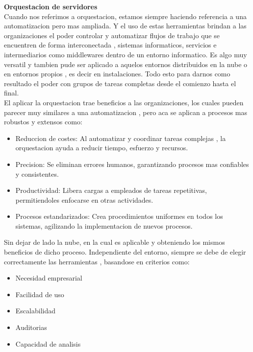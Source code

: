 \documentclass[12pt]{article}
\begin{document}
\vspace{1em}
\noindent\textbf{Orquestacion de servidores} \\
Cuando nos referimos a orquestacion, estamos siempre haciendo referencia a una automatizacion pero mas ampliada. Y el uso de estas herramientas brindan a las organizaciones el poder controlar y automatizar flujos de trabajo que se encuentren de forma interconectada , sistemas informaticos, servicios e intermediarios como middlewares dentro de un entorno informatico. Es algo muy versatil y tambien pude ser aplicado a aquelos entornos distribuidos en la nube o en entornos propios , es decir en instalaciones. Todo esto para darnos como resultado el poder con grupos de tareas completas desde el comienzo hasta el final.
\\
El aplicar la orquestacion trae beneficios a las organizaciones, los cuales pueden parecer muy similares a una automatizacion , pero  aca se aplican a procesos mas robustos y extensos como:
\begin{itemize}
    \item Reduccion de costes: Al automatizar y coordinar tareas complejas , la orquestacion ayuda a reducir tiempo, esfuerzo y recursos. 
    \item Precision: Se eliminan errores humanos, garantizando procesos mas confiables y consistentes.
    \item Productividad: Libera cargas a empleados de tareas repetitivas, permitiendoles enfocarse en otras actividades.
        \item Procesos estandarizados: Crea procedimientos uniformes en todos los sistemas, agilizando la implementacion de nuevos procesos.
\end{itemize}
Sin dejar de lado la nube, en la cual es aplicable y obteniendo los mismos beneficios de dicho proceso. Independiente del entorno, siempre se debe de elegir correctamente las herramientas , basandose en criterios como:
\begin{itemize}
    \item Necesidad empresarial
    \item Facilidad de uso
    \item Escalabilidad
    \item Auditorias
    \item Capacidad de analisis
\end{itemize}
\end{document}
